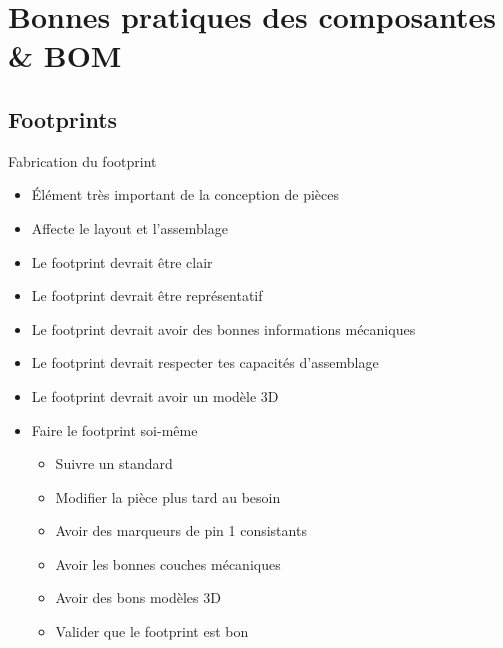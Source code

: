 

\section{Bonnes pratiques des composantes \& BOM}

\subsection{Footprints}
\begin{frame}{Fabrication du footprint}
    \begin{twocolumns}
        \leftcol
        \begin{itemize}
            \item Élément très important de la conception de pièces
            \item Affecte le layout et l'assemblage
            \bigskip
            \item Le footprint devrait être clair
            \item Le footprint devrait être représentatif
            \item Le footprint devrait avoir des bonnes informations mécaniques
            \item Le footprint devrait respecter tes capacités d'assemblage
            \item Le footprint devrait avoir un modèle 3D
        \end{itemize}

        \rightcol
        \begin{itemize}
            \item Faire le footprint soi-même
            \begin{itemize}
                \item Suivre un standard
                \item Modifier la pièce plus tard au besoin
                \item Avoir des marqueurs de pin 1 consistants
                \item Avoir les bonnes couches mécaniques
                \item Avoir des bons modèles 3D
                \item Valider que le footprint est bon
            \end{itemize}
        \end{itemize}
    \end{twocolumns}
\end{frame}


